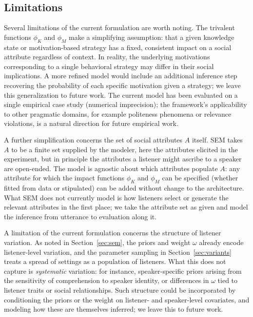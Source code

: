 \documentclass[12pt,a4paper]{article}
\begin{document}
\subsection{Limitations}
Several limitations of the current formulation are worth noting. The trivalent
functions $\phi_K$ and $\phi_M$ make a simplifying assumption: that a given
knowledge state or motivation-based strategy has a fixed, consistent impact on a
social attribute regardless of context. In reality, the underlying motivations
corresponding to a single behavioral strategy may differ in their social
implications. A more refined model would include an additional inference step
recovering the probability of each specific motivation given a strategy; we leave
this generalization to future work. The current model has been evaluated on a
single empirical case study (numerical imprecision); the framework's
applicability to other pragmatic domains, for example politeness phenomena or
relevance violations, is a natural direction for future empirical work.

A further simplification concerns the set of social attributes $A$ itself. SEM
takes $A$ to be a finite set supplied by the modeler, here the attributes
elicited in the experiment, but in principle the attributes a listener might
ascribe to a speaker are open-ended. The model is agnostic about which attributes
populate $A$: any attribute for which the impact functions $\phi_K$ and $\phi_M$
can be specified (whether fitted from data or stipulated) can be added without
change to the architecture. What SEM does not currently model is how listeners
select or generate the relevant attributes in the first place; we take the
attribute set as given and model the inference from utterance to evaluation along
it.

A limitation of the current formulation concerns the structure of listener
variation. As noted in Section~\ref{sec:sem}, the priors and weight $\omega$
already encode listener-level variation, and the parameter sampling in
Section~\ref{sec:variants} treats a spread of settings as a population of
listeners. What this does not capture is \emph{systematic} variation: for
instance, speaker-specific priors arising from the sensitivity of comprehension
to speaker identity, or differences in $\omega$ tied to listener traits or social
relationships. Such structure could be incorporated by conditioning the priors
or the weight on listener- and speaker-level covariates, and modeling how these
are themselves inferred; we leave this to future work.
\end{document}
